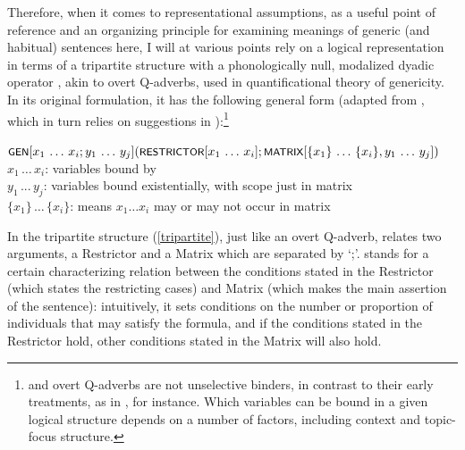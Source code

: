 \documentclass[output=paper,colorlinks,citecolor=brown]{langscibook}
\begin{document}
Therefore, when it comes to representational assumptions, as a useful point of reference
and an organizing principle for examining meanings of generic 
(and habitual) sentences here, 
I will at various points rely on a logical representation in terms of a tripartite structure with a phonologically null, modalized dyadic operator , akin to overt Q-adverbs, used in quantificational theory of genericity. In its original formulation,
it has the following
general form (adapted from \citealt[32, ex.~(57)]{krifka1995genericity}, which in turn relies on suggestions in \citealt{krifka1987nominal}):\footnote{ and overt Q-adverbs are not unselective binders, in contrast to their early treatments, 
as in \citet{carlpell1995generic}, for instance. Which variables can be bound in a given logical structure depends on a number of factors, including context and topic-focus structure.}

\ea $\cnst{Gen} [x_1\, \dots\, x_i ; y_1\, \dots\, y_j](\cnst{Restrictor} [x_1\, \dots\, x_i]; \cnst{Matrix} [\{x_1\}\, \dots\, \{x_i\}, y_1\, \dots\, y_j])$\\\label{tripartite}	
$x_1\, \dots\, x_i$: variables bound by \\	$y_1\, ...\, y_j$: variables bound existentially, with scope just in matrix \\		 
$\{x_1\}\, \dots\, \{x_i\}$: 	means $x_1 \dots x_i$ may or may not occur in matrix 
\z

\noindent
In the tripartite structure (\ref{tripartite}),
just like an overt Q-adverb,  relates two arguments, a Restrictor and a Matrix  which are separated by `;'.   stands for a certain characterizing relation between the conditions stated in the Restrictor (which states the restricting cases) and 
Matrix (which makes the main assertion of the sentence):  intuitively, it sets conditions on the number or proportion of individuals
that may satisfy the formula, and if the conditions stated in the Restrictor hold, other conditions stated in the Matrix  will also hold.
\end{document}
